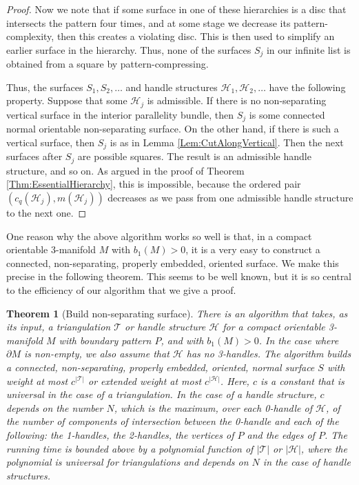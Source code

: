 \documentclass[oneside]{amsart}
\numberwithin{equation}{section}
\theoremstyle{plain}
\newtheorem{theorem}[equation]{Theorem}
\theoremstyle{definition}
\newcommand{\calT}{{\mathcal{T}}}
\newcommand{\calH}{\mathcal{H}}
\begin{document}
\begin{proof}
Now we note that if some surface in one of these hierarchies is a disc that intersects the pattern four times, and at some stage we decrease its pattern-complexity, then this creates a violating disc. This is then used to simplify an earlier surface in the hierarchy. Thus, none of the surfaces $S_j$ in our infinite list is obtained from a square by pattern-compressing.

Thus, the surfaces $S_1, S_2, \dots$ and handle structures $\mathcal{H}_1, \mathcal{H}_2, \dots$ have the following property. Suppose that some $\mathcal{H}_j$ is admissible. If there is no non-separating vertical surface in the interior parallelity bundle, then $S_j$ is some connected normal orientable non-separating surface. On the other hand, if there is such a vertical surface, then $S_j$ is as in Lemma \ref{Lem:CutAlongVertical}. Then the next surfaces after $S_{j}$ are possible squares. The result is an admissible handle structure, and so on. As argued in the proof of Theorem \ref{Thm:EssentialHierarchy}, this is impossible, because the ordered pair $(c_q(\mathcal{H}_j), m(\mathcal{H}_j))$ decreases as we pass from one admissible handle structure to the next one.
\end{proof}

One reason why the above algorithm works so well is that, in a compact orientable 3-manifold $M$ with $b_1(M)>0$, it is a very easy to construct
a connected, non-separating, properly embedded, oriented surface. We make this precise in the following theorem. This seems to be well known, but
it is so central to the efficiency of our algorithm that we give a proof.

\begin{theorem}[{\sc Build non-separating surface}]
\label{Thm:BuildSurface}
There is an algorithm that takes, as its input, a triangulation $\calT$ or handle structure $\calH$ for a compact orientable 3-manifold $M$ with boundary pattern $P$, and with $b_1(M) > 0$. In the case where $\partial M$ is non-empty, we also assume that $\calH$ has no 3-handles. The algorithm builds a connected, non-separating, properly embedded, oriented, normal surface $S$ with weight at most $c^{|\calT|}$ or extended weight at most $c^{|\calH|}$. Here, $c$ is a constant that is universal in the case of a triangulation. In the case of a handle structure, $c$ depends on the number $N$, which is the maximum, over each 0-handle of $\calH$, of the number of components of intersection between the 0-handle and each of the following: the 1-handles, the 2-handles, the vertices of $P$ and the edges of $P$. The running time is bounded above by a polynomial function of $|\calT|$ or $|\calH|$, where the polynomial is universal for triangulations and depends on $N$ in the case of handle structures.
\end{theorem}
\end{document}
